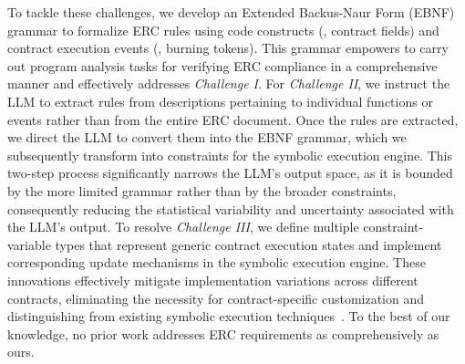 To tackle these challenges, we develop an Extended Backus-Naur Form (EBNF) grammar to 
formalize ERC rules using code constructs (\eg, contract fields) and contract execution events (\eg, burning tokens). This grammar empowers \Tool{} to carry out 
program analysis tasks for verifying ERC compliance in a comprehensive manner
and effectively addresses \textit{Challenge I}.
For \textit{Challenge II}, we instruct the LLM to extract rules from descriptions pertaining to 
individual functions or events rather than from the entire ERC document. 
Once the rules are extracted, we direct the LLM to convert them into the EBNF grammar,
which we subsequently transform into constraints for the symbolic execution engine. 
This two-step process significantly narrows the LLM's output space, as it is bounded by the more limited grammar rather than by the broader constraints, consequently reducing the statistical variability and uncertainty associated with the LLM’s output.
To resolve \textit{Challenge III}, we define multiple constraint-variable types 
that represent generic contract execution states and 
implement corresponding update mechanisms in the symbolic execution engine. 
These innovations effectively mitigate implementation variations 
across different contracts, eliminating the necessity 
for contract-specific customization and distinguishing \Tool{} from 
existing symbolic execution techniques~\cite{klee,S2E,SymCC}.
To the best of our knowledge, no prior work addresses ERC requirements 
as comprehensively as ours.







